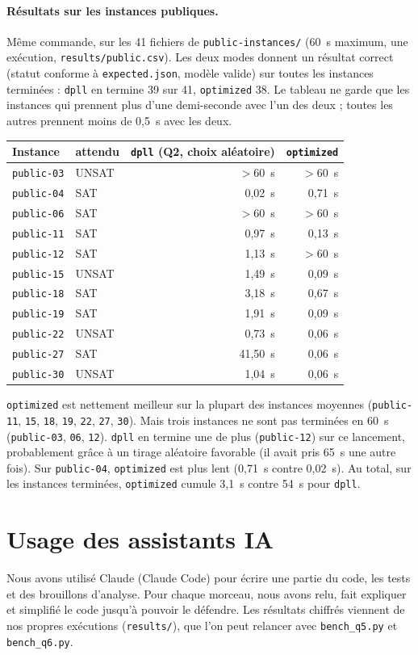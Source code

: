 \documentclass[11pt,a4paper]{article}
\newcommand{\f}[1]{\texttt{#1}}
\begin{document}
\paragraph{Résultats sur les instances publiques.} Même commande, sur les 41 fichiers de \f{public-instances/} (60~s maximum, une exécution, \f{results/public.csv}). Les deux modes donnent un résultat correct (statut conforme à \f{expected.json}, modèle valide) sur toutes les instances terminées : \f{dpll} en termine 39 sur 41, \f{optimized} 38. Le tableau ne garde que les instances qui prennent plus d'une demi-seconde avec l'un des deux ; toutes les autres prennent moins de 0,5~s avec les deux.

\medskip
\begin{tabular}{llrr}
\toprule
Instance & attendu & \f{dpll} (Q2, choix aléatoire) & \f{optimized}\\
\midrule
\f{public-03} & UNSAT & $>$60~s & $>$60~s \\
\f{public-04} & SAT & 0,02~s & 0,71~s \\
\f{public-06} & SAT & $>$60~s & $>$60~s \\
\f{public-11} & SAT & 0,97~s & 0,13~s \\
\f{public-12} & SAT & 1,13~s & $>$60~s \\
\f{public-15} & UNSAT & 1,49~s & 0,09~s \\
\f{public-18} & SAT & 3,18~s & 0,67~s \\
\f{public-19} & SAT & 1,91~s & 0,09~s \\
\f{public-22} & UNSAT & 0,73~s & 0,06~s \\
\f{public-27} & SAT & 41,50~s & 0,06~s \\
\f{public-30} & UNSAT & 1,04~s & 0,06~s \\
\bottomrule
\end{tabular}
\medskip

\f{optimized} est nettement meilleur sur la plupart des instances moyennes (\f{public-11}, \f{15}, \f{18}, \f{19}, \f{22}, \f{27}, \f{30}). Mais trois instances ne sont pas terminées en 60~s (\f{public-03}, \f{06}, \f{12}). \f{dpll} en termine une de plus (\f{public-12}) sur ce lancement, probablement grâce à un tirage aléatoire favorable (il avait pris 65~s une autre fois). Sur \f{public-04}, \f{optimized} est plus lent (0,71~s contre 0,02~s). Au total, sur les instances terminées, \f{optimized} cumule 3,1~s contre 54~s pour \f{dpll}.

\section*{Usage des assistants IA}

Nous avons utilisé Claude (Claude Code) pour écrire une partie du code, les tests et des brouillons d'analyse. Pour chaque morceau, nous avons relu, fait expliquer et simplifié le code jusqu'à pouvoir le défendre. Les résultats chiffrés viennent de nos propres exécutions (\f{results/}), que l'on peut relancer avec \f{bench\_q5.py} et \f{bench\_q6.py}.
\end{document}
